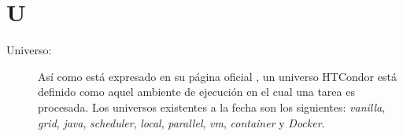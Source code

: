 \section*{U}
\begin{description}
	\item[Universo:] Así como está expresado en su página oficial \citep{HTCondor}, un universo HTCondor está definido como aquel ambiente de ejecución en el cual una tarea es procesada. Los universos existentes a la fecha son los siguientes: \textit{vanilla}, \textit{grid}, \textit{java}, \textit{scheduler}, \textit{local}, \textit{parallel}, \textit{vm}, \textit{container} y \textit{Docker}.
\end{description}
